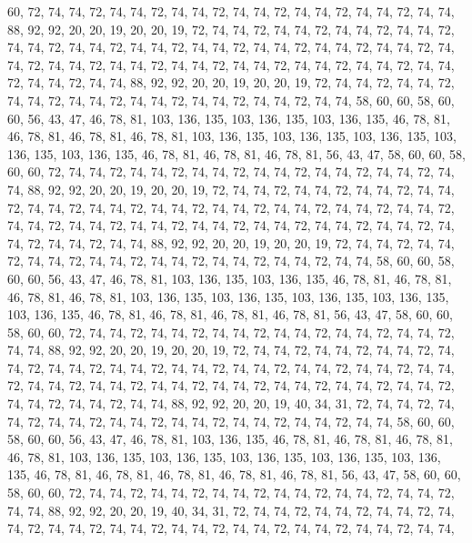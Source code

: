 60, 72, 74, 74, 72, 74, 74, 72, 74, 74, 72, 74, 74, 72, 74, 74, 72, 74, 74, 72, 74, 74, 88, 92, 92, 20, 20, 19, 20, 20, 19, 72, 74, 74, 72, 74, 74, 72, 74, 74, 72, 74, 74, 72, 74, 74, 72, 74, 74, 72, 74, 74, 72, 74, 74, 72, 74, 74, 72, 74, 74, 72, 74, 74,
72, 74, 74, 72, 74, 74, 72, 74, 74, 72, 74, 74, 72, 74, 74, 72, 74, 74, 72, 74, 74, 72, 74, 74, 72, 74, 74, 72, 74, 74, 88, 92, 92, 20, 20, 19, 20, 20, 19, 72, 74, 74, 72, 74, 74, 72, 74, 74, 72, 74, 74, 72, 74, 74, 72, 74, 74, 72, 74, 74, 72, 74, 74, 58,
60, 60, 58, 60, 60, 56, 43, 47, 46, 78, 81, 103, 136, 135, 103, 136, 135, 103, 136, 135, 46, 78, 81, 46, 78, 81, 46, 78, 81, 46, 78, 81, 103, 136, 135, 103, 136, 135, 103, 136, 135, 103, 136, 135, 103, 136, 135, 46, 78, 81, 46, 78, 81, 46, 78, 81, 56, 43, 47, 58, 60, 60, 58, 60,
60, 72, 74, 74, 72, 74, 74, 72, 74, 74, 72, 74, 74, 72, 74, 74, 72, 74, 74, 72, 74, 74, 88, 92, 92, 20, 20, 19, 20, 20, 19, 72, 74, 74, 72, 74, 74, 72, 74, 74, 72, 74, 74, 72, 74, 74, 72, 74, 74, 72, 74, 74, 72, 74, 74, 72, 74, 74, 72, 74, 74, 72, 74, 74,
72, 74, 74, 72, 74, 74, 72, 74, 74, 72, 74, 74, 72, 74, 74, 72, 74, 74, 72, 74, 74, 72, 74, 74, 72, 74, 74, 72, 74, 74, 88, 92, 92, 20, 20, 19, 20, 20, 19, 72, 74, 74, 72, 74, 74, 72, 74, 74, 72, 74, 74, 72, 74, 74, 72, 74, 74, 72, 74, 74, 72, 74, 74, 58,
60, 60, 58, 60, 60, 56, 43, 47, 46, 78, 81, 103, 136, 135, 103, 136, 135, 46, 78, 81, 46, 78, 81, 46, 78, 81, 46, 78, 81, 103, 136, 135, 103, 136, 135, 103, 136, 135, 103, 136, 135, 103, 136, 135, 46, 78, 81, 46, 78, 81, 46, 78, 81, 46, 78, 81, 56, 43, 47, 58, 60, 60, 58, 60,
60, 72, 74, 74, 72, 74, 74, 72, 74, 74, 72, 74, 74, 72, 74, 74, 72, 74, 74, 72, 74, 74, 88, 92, 92, 20, 20, 19, 20, 20, 19, 72, 74, 74, 72, 74, 74, 72, 74, 74, 72, 74, 74, 72, 74, 74, 72, 74, 74, 72, 74, 74, 72, 74, 74, 72, 74, 74, 72, 74, 74, 72, 74, 74,
72, 74, 74, 72, 74, 74, 72, 74, 74, 72, 74, 74, 72, 74, 74, 72, 74, 74, 72, 74, 74, 72, 74, 74, 72, 74, 74, 72, 74, 74, 88, 92, 92, 20, 20, 19, 40, 34, 31, 72, 74, 74, 72, 74, 74, 72, 74, 74, 72, 74, 74, 72, 74, 74, 72, 74, 74, 72, 74, 74, 72, 74, 74, 58,
60, 60, 58, 60, 60, 56, 43, 47, 46, 78, 81, 103, 136, 135, 46, 78, 81, 46, 78, 81, 46, 78, 81, 46, 78, 81, 103, 136, 135, 103, 136, 135, 103, 136, 135, 103, 136, 135, 103, 136, 135, 46, 78, 81, 46, 78, 81, 46, 78, 81, 46, 78, 81, 46, 78, 81, 56, 43, 47, 58, 60, 60, 58, 60,
60, 72, 74, 74, 72, 74, 74, 72, 74, 74, 72, 74, 74, 72, 74, 74, 72, 74, 74, 72, 74, 74, 88, 92, 92, 20, 20, 19, 40, 34, 31, 72, 74, 74, 72, 74, 74, 72, 74, 74, 72, 74, 74, 72, 74, 74, 72, 74, 74, 72, 74, 74, 72, 74, 74, 72, 74, 74, 72, 74, 74, 72, 74, 74,
